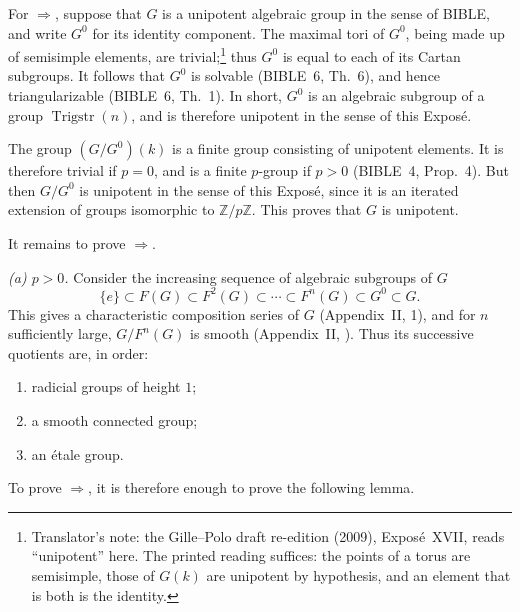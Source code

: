 For \(\Rightarrow\), suppose that \(G\) is a unipotent
algebraic group in the sense of BIBLE, and write \(G^0\) for its
identity component.  The maximal tori of \(G^0\), being made up of
semisimple elements, are trivial;\footnote{Translator's note: the Gille--Polo draft re-edition (2009),
Exposé~XVII, reads ``unipotent'' here. The printed reading suffices: the points of a torus are
semisimple, those of \(G(k)\) are unipotent by hypothesis, and an element that is both is the identity.} thus \(G^0\) is equal to each of its
Cartan subgroups.  It follows that \(G^0\) is solvable
(BIBLE~6, Th.~6), and hence triangularizable
(BIBLE~6, Th.~1).  In short, \(G^0\) is an algebraic subgroup of a
group \(\operatorname{Trigstr}(n)\), and is therefore unipotent in
the sense of this Exposé.

The group \((G/G^0)(k)\) is a finite group consisting of unipotent
elements.  It is therefore trivial if \(p=0\), and is a finite
\(p\)-group if \(p>0\) (BIBLE~4, Prop.~4).  But then \(G/G^0\) is
unipotent in the sense of this Exposé, since it is an iterated
extension of groups isomorphic to \(\mathbb Z/p\mathbb Z\).  This
proves that \(G\) is unipotent.

It remains to prove \(\Rightarrow\).

\smallskip
\noindent\textit{(a) \(p>0\).}\quad
Consider the increasing sequence of algebraic subgroups of \(G\)
\[
  \{e\}\subset F(G)\subset F^2(G)\subset\cdots\subset
  F^n(G)\subset G^0\subset G.
\]
This gives a characteristic composition series of \(G\)
(Appendix~II, 1), and for \(n\) sufficiently large,
\(G/F^n(G)\) is smooth (Appendix~II, ).  Thus its successive
quotients are, in order:
\begin{enumerate}
\item[(i)] radicial groups of height \(1\);
\item[(ii)] a smooth connected group;
\item[(iii)] an étale group.
\end{enumerate}
To prove \(\Rightarrow\), it is therefore enough to prove the
following lemma.

